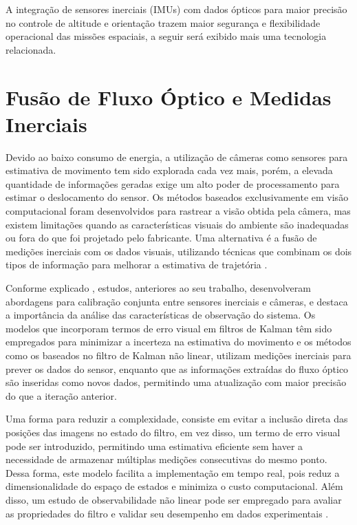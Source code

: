 A integração de sensores inerciais (IMUs) com dados ópticos para maior precisão no controle de altitude e orientação trazem maior segurança e flexibilidade operacional das missões espaciais, a seguir será exibido mais uma tecnologia relacionada.

\section{Fusão de Fluxo Óptico e Medidas Inerciais}

Devido ao baixo consumo de energia, a utilização de câmeras como sensores para estimativa de movimento tem sido explorada cada vez mais, porém, a elevada quantidade de informações geradas exige um alto poder de processamento para estimar o deslocamento do sensor. Os métodos baseados exclusivamente em visão computacional foram desenvolvidos para rastrear a visão obtida pela câmera, mas existem limitações quando as características visuais do ambiente são inadequadas ou fora do que foi projetado pelo fabricante. Uma alternativa é a fusão de medições inerciais com os dados visuais, utilizando técnicas que combinam os dois tipos de informação para melhorar a estimativa de trajetória \cite{bloesch2014}.

Conforme explicado \cite{bloesch2014}, estudos, anteriores ao seu trabalho, desenvolveram abordagens para calibração conjunta entre sensores inerciais e câmeras, e destaca a importância da análise das características de observação do sistema. Os modelos que incorporam termos de erro visual em filtros de Kalman têm sido empregados para minimizar a incerteza na estimativa do movimento e os métodos como os baseados no filtro de Kalman não linear, utilizam medições inerciais para prever os dados do sensor, enquanto que as informações extraídas do fluxo óptico são inseridas como novos dados, permitindo uma atualização com maior precisão do que a iteração anterior.

Uma forma para reduzir a complexidade, consiste em evitar a inclusão direta das posições das imagens no estado do filtro, em vez disso, um termo de erro visual pode ser introduzido, permitindo uma estimativa eficiente sem haver a necessidade de armazenar múltiplas medições consecutivas do mesmo ponto. Dessa forma, este modelo facilita a implementação em tempo real, pois reduz a dimensionalidade do espaço de estados e minimiza o custo computacional. Além disso, um estudo de observabilidade não linear pode ser empregado para avaliar as propriedades do filtro e validar seu desempenho em dados experimentais \cite{bloesch2014}.
